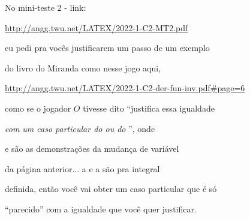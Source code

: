 \documentclass[oneside,12pt]{article}
\begin{document}
\newpage

No mini-teste 2 - link:

\ssk

{\footnotesize

\url{http://angg.twu.net/LATEX/2022-1-C2-MT2.pdf}

}

\ssk

eu pedi pra vocês justificarem um passo de um exemplo

do livro do Miranda como nesse jogo aqui,

\ssk

{\footnotesize

\url{http://angg.twu.net/LATEX/2022-1-C2-der-fun-inv.pdf#page=6}

}

como se o jogador $O$ tivesse dito ``justifica essa igualdade

{\sl com um caso particular do \ga{[MV1]} ou do \ga{[MV3]}}'', onde

\ga{[MV1]} e \ga{[MV3]} são as demonstrações da mudança de variável

da página anterior... a \ga{[MV1]} e a \ga{[MV3]} são pra integral

definida, então você vai obter um caso particular que é só

``parecido'' com a igualdade que você quer justificar.



\pu
\end{document}
